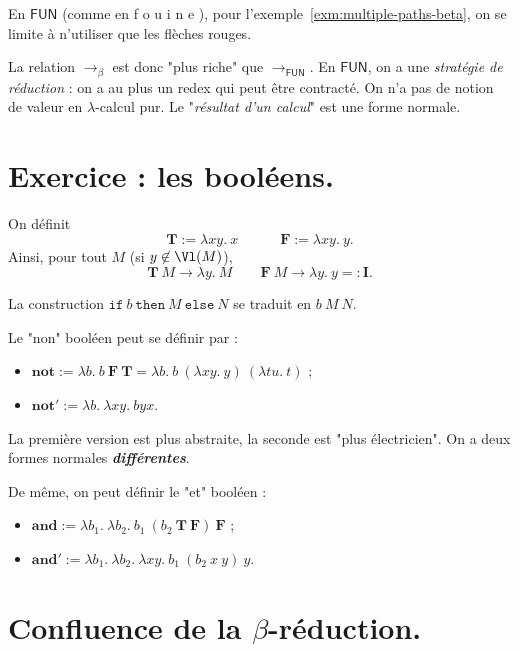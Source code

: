 \documentclass{../notes}
\newcommand\fouine{%
  \textsf{%
  \textcolor{deepblue}  {f}%
  \textcolor{deeppurple}{o}%
  \textcolor{deepblue}  {u}%
  \textcolor{deeppurple}{i}%
  \textcolor{deepblue}  {n}%
  \textcolor{deeppurple}{e}%
  }%
}
\begin{document}
  En $\mathsf{FUN}$ (comme en \fouine), pour l'exemple~\ref{exm:multiple-paths-beta}, on se limite à n'utiliser que les flèches rouges.

  La relation $\to_\beta$ est donc "plus riche" que $\to_\mathsf{FUN}$.
  En $\mathsf{FUN}$, on a une \textit{stratégie de réduction} : on a au plus un redex qui peut être contracté.
  On n'a pas de notion de valeur en $\lambda$-calcul pur. Le "\textit{résultat d'un calcul}" est une forme normale.

  \section{Exercice : les booléens.}
  On définit \[
  \mathbf{T} := \lambda x y. \: x \quad\quad\quad \mathbf{F} := \lambda xy. \: y
  .\]
  Ainsi, pour tout $M$ (si $y \not\in \Vl(M)$), \[
  \mathbf{T}\: M \to \lambda y.\: M \quad\quad \mathbf{F} \: M \to \lambda y. \: y =: \mathbf{I}
  .\]

  La construction $\mathtt{if}\ b\ \mathtt{then}\ M\ \mathtt{else}\ N$ se traduit en $b \: M \: N$.

  Le "non" booléen peut se définir par :
  \begin{itemize}
    \item $\mathbf{not} := \lambda b. \: b \: \mathbf{F}\: \mathbf{T} = \lambda b.\: b\: (\lambda x y.\: y) \: (\lambda t u.\: t)$ ;
    \item $\mathbf{not}' := \lambda b.\: \lambda x y.\: b y x$.
  \end{itemize}
  La première version est plus abstraite, la seconde est "plus électricien".
  On a deux formes normales \textit{\textbf{différentes}}.

  De même, on peut définir le "et" booléen :
  \begin{itemize}
    \item $\mathbf{and} := \lambda b_1. \: \lambda b_2. \: b_1\: (b_2\: \mathbf{T}\: \mathbf{F})\: \mathbf{F}$ ;
    \item $\mathbf{and}' := \lambda b_1. \:\lambda b_2.\: \lambda x y. \: b_1 \: (b_2 \: x \: y) \: y$.
  \end{itemize}

  \section{Confluence de la $\beta$-réduction.}
\end{document}
